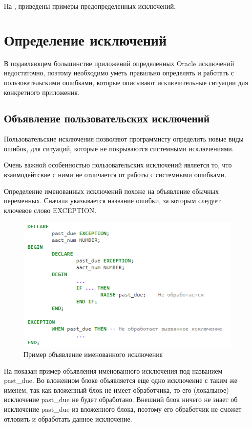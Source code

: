 На , приведены примеры предопределенных исключений. 

\section{Определение исключений} \label{ch1:sec2}
В подавляющем большинстве приложений определенных Oracle исключений недостаточно, поэтому необходимо уметь правильно определять и работать с пользовательскими ошибками, которые описывают исключительные ситуации для конкретного приложения.

\subsection{Объявление пользовательских исключений}

Пользовательские исключения позволяют программисту определить новые виды ошибок, для ситуаций, которые не покрываются системными исключениями. 

Очень важной особенностью пользовательских исключений является то, что взаимодейтсвие с ними не отличается от работы с системными ошибками. 

Определение именованных исключений похоже на объявление обычных переменных. Сначала указывается название ошибки, за которым следует ключевое слово EXCEPTION. 

\begin{figure}[ht!] 
	\center
	\includegraphics [scale=1] {my_folder/img/C1_exeception_declaration}
	\caption{Пример объявление именованного исключения} 
	\label{fig:C1_exeception_declaration}  
\end{figure}
\FloatBarrier

На  показан пример объявления именованного исключения под названием past\_due. Во вложенном блоке объявляется еще одно исключение с таким же именем, так как вложенный блок не имеет обработчика, то его (локальное) исключение past\_due не будет обработано. Внешний блок ничего не знает об исключение past\_due из вложенного блока, поэтому его обработчик не сможет отловить и обработать данное исключение\cite{handling-errors}.

